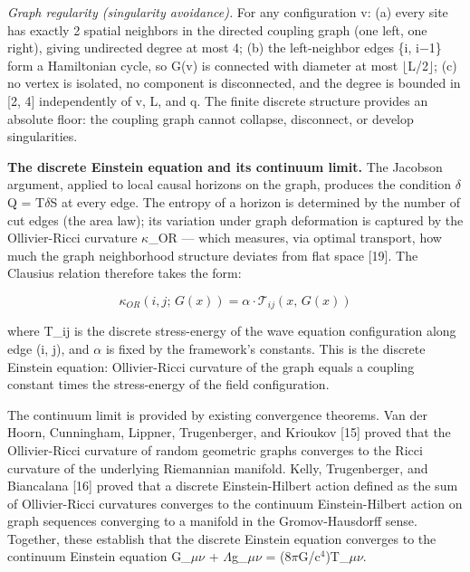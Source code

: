 \documentclass[
  11pt,
]{article}
\begin{document}
\emph{Graph regularity (singularity avoidance).} For any configuration
v: (a) every site has exactly 2 spatial neighbors in the directed
coupling graph (one left, one right), giving undirected degree at most
4; (b) the left-neighbor edges \{i, i\ensuremath{-}1\} form a Hamiltonian cycle, so
G(v) is connected with diameter at most \ensuremath{\lfloor}L/2\ensuremath{\rfloor}; (c) no vertex is
isolated, no component is disconnected, and the degree is bounded in
{[}2, 4{]} independently of v, L, and q. The finite discrete structure
provides an absolute floor: the coupling graph cannot collapse,
disconnect, or develop singularities.

\textbf{The discrete Einstein equation and its continuum limit.} The
Jacobson argument, applied to local causal horizons on the graph,
produces the condition \ensuremath{\delta}Q = T\ensuremath{\delta}S at every edge. The entropy of a horizon
is determined by the number of cut edges (the area law); its variation
under graph deformation is captured by the Ollivier-Ricci curvature
\ensuremath{\kappa}\_OR --- which measures, via optimal transport, how much the graph
neighborhood structure deviates from flat space {[}19{]}. The Clausius
relation therefore takes the form:

\[\kappa_{OR}(i, j;\, G(x)) = \alpha \cdot \mathcal{T}_{ij}(x,\, G(x))\]

where T\_ij is the discrete stress-energy of the wave equation
configuration along edge (i, j), and \ensuremath{\alpha} is fixed by the framework's
constants. This is the discrete Einstein equation: Ollivier-Ricci
curvature of the graph equals a coupling constant times the
stress-energy of the field configuration.

The continuum limit is provided by existing convergence theorems. Van
der Hoorn, Cunningham, Lippner, Trugenberger, and Krioukov {[}15{]}
proved that the Ollivier-Ricci curvature of random geometric graphs
converges to the Ricci curvature of the underlying Riemannian manifold.
Kelly, Trugenberger, and Biancalana {[}16{]} proved that a discrete
Einstein-Hilbert action defined as the sum of Ollivier-Ricci curvatures
converges to the continuum Einstein-Hilbert action on graph sequences
converging to a manifold in the Gromov-Hausdorff sense. Together, these
establish that the discrete Einstein equation converges to the continuum
Einstein equation G\_\ensuremath{\mu}\ensuremath{\nu} + \ensuremath{\Lambda}g\_\ensuremath{\mu}\ensuremath{\nu} = (8\ensuremath{\pi}G/c\ensuremath{^4})T\_\ensuremath{\mu}\ensuremath{\nu}.
\end{document}
